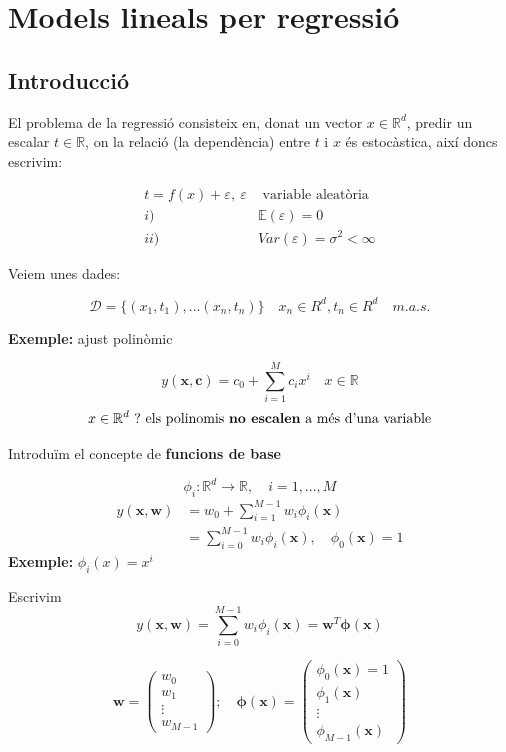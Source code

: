 \chapter{Models lineals per regressió}
\section{Introducció}
El problema de la regressió consisteix en, donat un vector $x \in \mathbb{R}^d$, predir un escalar $t \in \mathbb{R}$, on la relació (la dependència) entre $t$ i $x$ és estocàstica, així doncs escrivim:


\begin{align*}
t = f(x) + \varepsilon,\ \varepsilon &\text{ variable aleatòria} \\
i) \quad &\mathbb{E}(\varepsilon) = 0 \\
ii)\quad & Var(\varepsilon) = \sigma^2 < \infty
\end{align*}

Veiem unes dades:

$$
\mathcal{D} = \{ (x_1, t_1), ... (x_n, t_n)  \} \quad x_n \in R^d, t_n \in R^d \quad m.a.s.
$$

\textbf{Exemple:} ajust polinòmic

$$
y(\boldsymbol{x}, \boldsymbol{c}) = c_0 + \sum_{i=1}^M c_i x^i \quad x \in \mathbb{R}
$$
$$
x \in \mathbb{R}^d\ ? \text{ els polinomis \textbf{no escalen} a més d'una variable}
$$

Introduïm el concepte de \textbf{funcions de base}

$$
\phi_i: \mathbb{R}^d \rightarrow \mathbb{R}, \quad i = 1,...,M
$$
\begin{align*}
y(\textbf{x}, \boldsymbol{w}) &= w_0 + \sum_{i=1}^{M-1} w_i \phi_i (\textbf{x}) \\
&=  \sum_{i=0}^{M-1} w_i \phi_i (\boldsymbol{x}), \quad \phi_0 (\boldsymbol{x}) = 1
\end{align*}
\textbf{Exemple:} $\phi_i (x) = x^i$

Escrivim
$$
y(\boldsymbol{x}, \boldsymbol{w}) = \sum_{i=0}^{M-1} w_i \phi_i (\boldsymbol{x}) = \boldsymbol{w}^T \boldsymbol{\phi} (\boldsymbol{x})
$$

$$
\boldsymbol{w} = 
\begin{pmatrix}
w_0 \\ w_1 \\ \vdots \\ w_{M-1}
\end{pmatrix};\quad
\boldsymbol{\phi}(\boldsymbol{x}) = 
\begin{pmatrix}
\phi_0 (\boldsymbol{x}) = 1 \\
\phi_1 (\boldsymbol{x}) \\
\vdots \\
\phi_{M-1} (\boldsymbol{x})
\end{pmatrix}
$$

